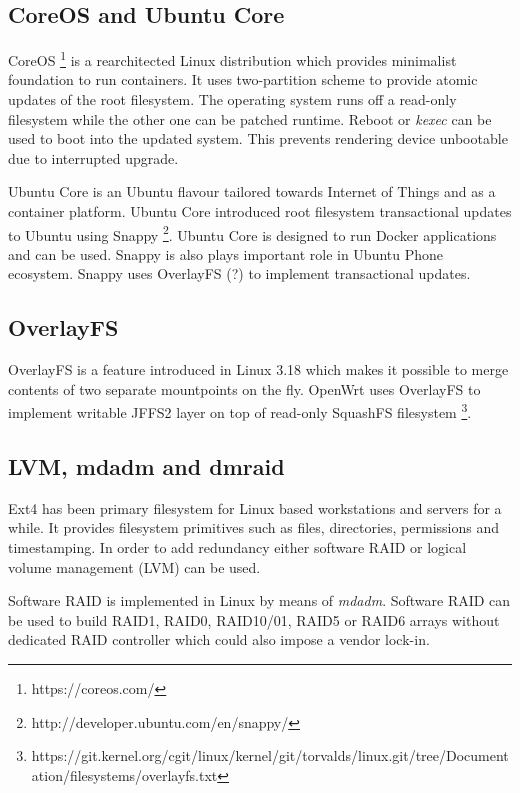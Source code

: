 \documentclass{article}
\begin{document}
\subsection{CoreOS and Ubuntu Core}

CoreOS \footnote{https://coreos.com/} is a rearchitected Linux
distribution which provides minimalist foundation to run containers.
It uses two-partition scheme to provide atomic updates of the root
filesystem. The operating system runs off a read-only filesystem
while the other one can be patched runtime. Reboot or \emph{kexec}
can be used to boot into the updated system. This prevents rendering
device unbootable due to interrupted upgrade.

Ubuntu Core is an Ubuntu flavour tailored towards Internet of Things
and as a container platform. Ubuntu Core introduced root filesystem
transactional updates to Ubuntu using Snappy
\footnote{http://developer.ubuntu.com/en/snappy/}.
Ubuntu Core is designed to run Docker applications and can be used.
Snappy is also plays important role in Ubuntu Phone ecosystem.
Snappy uses OverlayFS (?) to implement transactional updates.


\subsection{OverlayFS}

OverlayFS is a feature introduced in Linux 3.18 which makes it
possible to merge contents of two separate mountpoints on the fly.
OpenWrt uses OverlayFS to implement writable JFFS2 layer on top of
read-only SquashFS filesystem
\footnote{https://git.kernel.org/cgit/linux/kernel/git/torvalds/linux.git/tree/Documentation/filesystems/overlayfs.txt}.

\subsection{LVM, mdadm and dmraid}

Ext4 has been primary filesystem for Linux based workstations and
servers for a while. It provides filesystem primitives such as files,
directories, permissions and timestamping.
In order to add redundancy
either software RAID or logical volume management (LVM) can be used.

Software RAID is implemented in Linux by means of \emph{mdadm}.
Software RAID can be used to build RAID1, RAID0, RAID10/01, RAID5
or RAID6 arrays without dedicated RAID controller which could also
impose a vendor lock-in.
\end{document}
